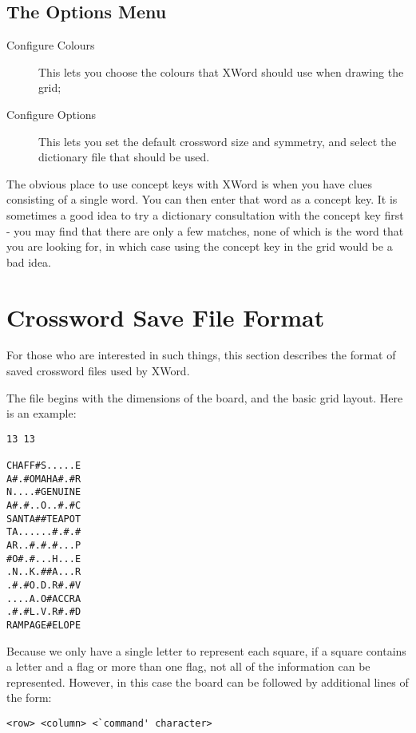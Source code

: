 \subsection{The Options Menu}

\begin{description}
\item [Configure Colours] This lets you choose the colours 
that XWord should use when drawing the grid;
\item [Configure Options] This lets you set the default
crossword size and symmetry, and select the dictionary
file that should be used.
\end{description}





The obvious place to use concept keys with XWord is when you have clues
consisting of a single word. You can then enter that word as a concept
key. It is sometimes a good idea to try a dictionary consultation with
the concept key first - you may find that there are only a few matches,
none of which is the word that you are looking for, in which case using
the concept key in the grid would be a bad idea.

\section{Crossword Save File Format}

For those who are interested in such things, this section describes the
format of saved crossword files used by XWord.

The file begins with the dimensions of the board, and the basic grid layout.
Here is an example:

\begin{verbatim}
13 13

CHAFF#S.....E
A#.#OMAHA#.#R
N....#GENUINE
A#.#..O..#.#C
SANTA##TEAPOT
TA......#.#.#
AR..#.#.#...P
#O#.#...H...E
.N..K.##A...R
.#.#O.D.R#.#V
....A.O#ACCRA
.#.#L.V.R#.#D
RAMPAGE#ELOPE
\end{verbatim}

Because we only have a
single letter to represent each square, if a square contains
a letter and a flag or more than one flag, not all of the information
can be represented. However, in this case the board can be followed by
additional lines of the form:

\begin{verbatim}
<row> <column> <`command' character>
\end{verbatim}

